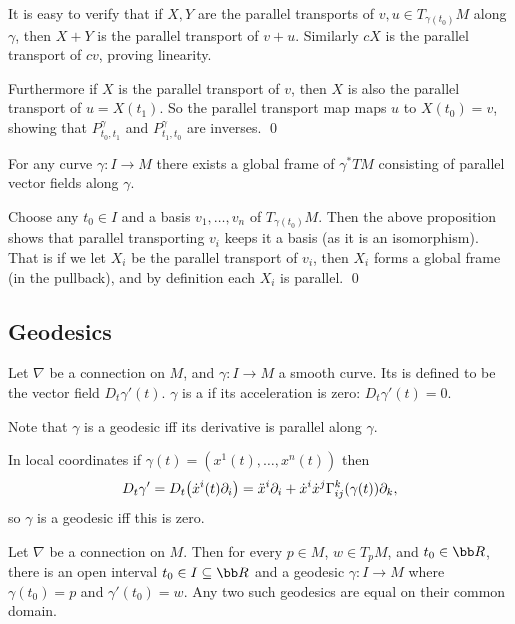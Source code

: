 \bproof

    It is easy to verify that if $X,Y$ are the parallel transports of $v,u\in T_{\gamma(t_0)}M$ along $\gamma$,
    then $X+Y$ is the parallel transport of $v+u$.
    Similarly $cX$ is the parallel transport of $cv$, proving linearity.

    Furthermore if $X$ is the parallel transport of $v$, then $X$ is also the parallel transport of $u=X(t_1)$.
    So the parallel transport map maps $u$ to $X(t_0)=v$, showing that $P^\gamma_{t_0,t_1}$ and $P^\gamma_{t_1,t_0}$
    are inverses.
    \qed

\eproof

\bcoro

    For any curve $\gamma\colon I\to M$ there exists a global frame of $\gamma^*TM$ consisting of parallel vector fields
    along $\gamma$.

\ecoro

\bproof

    Choose any $t_0\in I$ and a basis $v_1,\dots,v_n$ of $T_{\gamma(t_0)}M$.
    Then the above proposition shows that parallel transporting $v_i$ keeps it a basis (as it is an isomorphism).
    That is if we let $X_i$ be the parallel transport of $v_i$, then $X_i$ forms a global frame (in the pullback),
    and by definition each $X_i$ is parallel.
    \qed

\eproof

\subsection{Geodesics}

\bdefn

    Let $\nabla$ be a connection on $M$, and $\gamma\colon I\to M$ a smooth curve.
    Its  is defined to be the vector field $D_t\gamma'(t)$.
    $\gamma$ is a  if its acceleration is zero: $D_t\gamma'(t)=0$.

\edefn

Note that $\gamma$ is a geodesic iff its derivative is parallel along $\gamma$.

In local coordinates if $\gamma(t)=(x^1(t),\dots,x^n(t))$ then
$$ D_t\gamma' = D_t\mathopen{}\mathclose{\left(\dot x^i(t)\partial_i\right)} = \ddot x^i\partial_i + \dot x^i\dot x^j\Gamma^k_{ij}(\gamma(t))\partial_k , $$
so $\gamma$ is a geodesic iff this is zero.

\bthrm[title=Existence and uniqueness of geodesics]

    Let $\nabla$ be a connection on $M$.
    Then for every $p\in M$, $w\in T_pM$, and $t_0\in\bR$, there is an open interval $t_0\in I\subseteq\bR$ and a geodesic $\gamma\colon I\to M$
    where $\gamma(t_0)=p$ and $\gamma'(t_0)=w$.
    Any two such geodesics are equal on their common domain.

